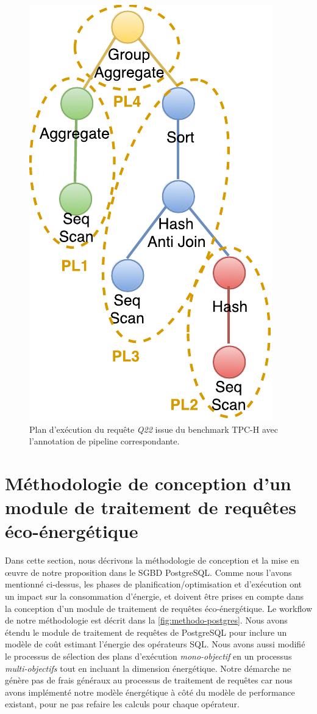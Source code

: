 \begin{figure}
	\centering
	\includegraphics[scale=0.6]{chapitre5/chap5Fig/q22-plan-pl.pdf}
	\caption{Plan d'exécution du requête \textit{Q22} issue du benchmark TPC-H avec l'annotation de pipeline correspondante.}
	\label{fig:q22-plan-pl}
\end{figure}

\section{Méthodologie de conception d'un module de traitement de requêtes éco-énergétique}\label{sec:Methodology}

Dans cette section, nous décrivons la méthodologie de conception et la mise en œuvre de notre proposition dans le SGBD PostgreSQL. Comme nous l'avons mentionné ci-dessus, les phases de planification/optimisation et d'exécution ont un impact sur la consommation d'énergie, et doivent être prises en compte dans la conception d'un module de traitement de requêtes éco-énergétique. Le workflow de notre méthodologie est décrit dans la \ref{fig:methodo-postgres}. Nous avons étendu le module de traitement de requêtes de PostgreSQL pour inclure un modèle de coût estimant l'énergie des opérateurs SQL. Nous avons aussi modifié le processus de sélection des plans d’exécution \textit{mono-objectif} en un processus \textit{multi-objectifs} tout en incluant la dimension énergétique. Notre démarche ne génère pas de frais généraux au processus de traitement de requêtes car nous avons implémenté notre modèle énergétique à côté du modèle de performance existant, pour ne pas refaire les calculs pour chaque opérateur.

